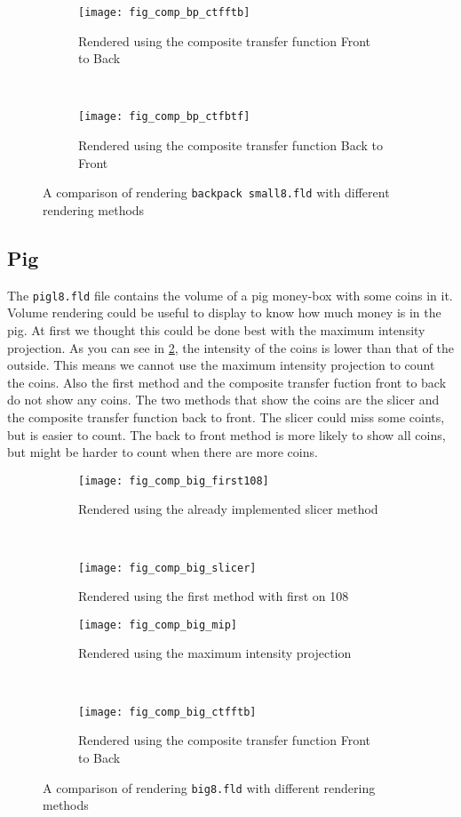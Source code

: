 \begin{figure}[H]
	\ContinuedFloat
	\centering
	\begin{subfigure}[t]{0.45\textwidth}
		\texttt{[image: fig\_comp\_bp\_ctfftb]}
		\caption{Rendered using the composite transfer function Front to Back}
	\end{subfigure}
	~%
	\begin{subfigure}[t]{0.45\textwidth}
		\texttt{[image: fig\_comp\_bp\_ctfbtf]}
		\caption{Rendered using the composite transfer function Back to Front}
	\end{subfigure}
	
	\caption{A comparison of rendering \texttt{backpack small8.fld} with different rendering methods}
	\label{fig:comp:bp}
\end{figure}

\subsection{Pig}
The \texttt{pigl8.fld} file contains the volume of a pig money-box with some coins in it.
Volume rendering could be useful to display to know how much money is in the pig.
At first we thought this could be done best with the maximum intensity projection.
As you can see in \ref{fig:comp:big}, the intensity of the coins is lower than that of the outside. 
This means we cannot use the maximum intensity projection to count the coins. 
Also the first method and the composite transfer fuction front to back do not show any coins. 
The two methods that show the coins are the slicer and the composite transfer function back to front. 
The slicer could miss some coints, but is easier to count. 
The back to front method is more likely to show all coins, but might be harder to count when there are more coins. 
\begin{figure}[H]
	\centering
	\begin{subfigure}[t]{0.45\textwidth}
		\texttt{[image: fig\_comp\_big\_first108]}
		\caption{Rendered using the already implemented slicer method}
	\end{subfigure}
	~%
	\begin{subfigure}[t]{0.45\textwidth}
		\texttt{[image: fig\_comp\_big\_slicer]}
		\caption{Rendered using the first method with first on 108}
	\end{subfigure}
	
	\begin{subfigure}[t]{0.45\textwidth}
		\texttt{[image: fig\_comp\_big\_mip]}
		\caption{Rendered using the maximum intensity projection}
	\end{subfigure}
	~%
	\begin{subfigure}[t]{0.45\textwidth}
		\texttt{[image: fig\_comp\_big\_ctfftb]}
		\caption{Rendered using the composite transfer function Front to Back}
	\end{subfigure}
	\caption{A comparison of rendering \texttt{big8.fld} with different rendering methods}
	\label{fig:comp:big}
\end{figure}
	
